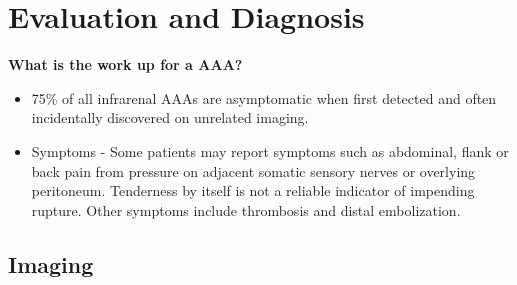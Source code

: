 \documentclass[
]{book}
\begin{document}
\hypertarget{evaluation-and-diagnosis}{%
\section{Evaluation and Diagnosis}\label{evaluation-and-diagnosis}}

\textbf{What is the work up for a AAA?}
\citep{mooreVascularEndovascularSurgery2019}

\begin{itemize}
\item
  75\% of all infrarenal AAAs are asymptomatic when first detected and
  often incidentally discovered on unrelated imaging.
\item
  Symptoms - Some patients may report symptoms such as abdominal,
  flank or back pain from pressure on adjacent somatic sensory nerves
  or overlying peritoneum. Tenderness by itself is not a reliable
  indicator of impending rupture. Other symptoms include thrombosis
  and distal embolization.
\end{itemize}

\hypertarget{imaging}{%
\subsection{Imaging}\label{imaging}}
\end{document}
